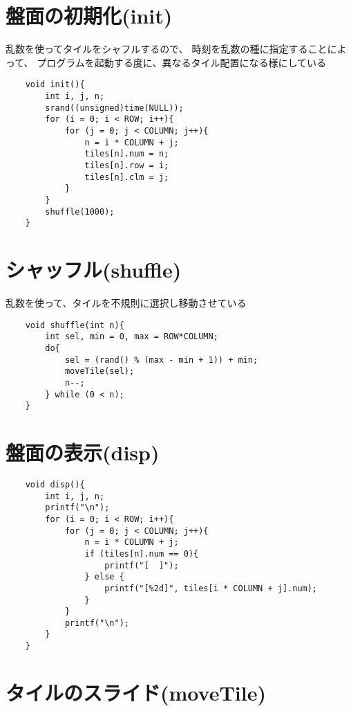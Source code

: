 \documentclass[uplatex,a4paper,11pt,oneside,openany]{jsarticle}
\begin{document}
\section{盤面の初期化(init)}

乱数を使ってタイルをシャフルするので、
時刻を乱数の種に指定することによって、
プログラムを起動する度に、異なるタイル配置になる様にしている

\begin{lstlisting}
	void init(){
		int i, j, n;
		srand((unsigned)time(NULL));
		for (i = 0; i < ROW; i++){
			for (j = 0; j < COLUMN; j++){
				n = i * COLUMN + j;
				tiles[n].num = n;
				tiles[n].row = i;
				tiles[n].clm = j;
			}
		}
		shuffle(1000);
	}
\end{lstlisting}

\section{シャッフル(shuffle)}

乱数を使って、タイルを不規則に選択し移動させている

\begin{lstlisting}
	void shuffle(int n){
		int sel, min = 0, max = ROW*COLUMN;
		do{
			sel = (rand() % (max - min + 1)) + min;
			moveTile(sel);
			n--;
		} while (0 < n);
	}
\end{lstlisting}

\newpage

\section{盤面の表示(disp)}

\begin{lstlisting}
	void disp(){
		int i, j, n;
		printf("\n");
		for (i = 0; i < ROW; i++){
			for (j = 0; j < COLUMN; j++){
				n = i * COLUMN + j;
				if (tiles[n].num == 0){
					printf("[  ]");
				} else {
					printf("[%2d]", tiles[i * COLUMN + j].num);
				}
			}
			printf("\n");
		}
	}
\end{lstlisting}

\section{タイルのスライド(moveTile)}
\end{document}
